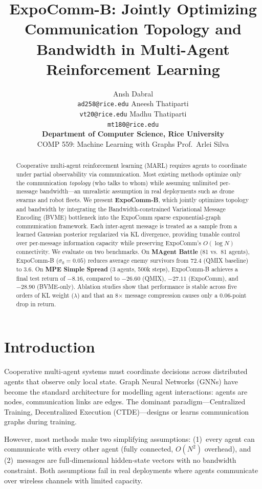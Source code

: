 \documentclass{article}
\title{ExpoComm-B: Jointly Optimizing Communication Topology and Bandwidth in Multi-Agent Reinforcement Learning}
\author{
  Ansh Dabral \\ \texttt{ad258@rice.edu}
  \And
  Aneesh Thatiparti \\ \texttt{vt20@rice.edu}
  \And
  Madhu Thatiparti \\ \texttt{mt180@rice.edu} \\[4pt]
  \textbf{Department of Computer Science, Rice University} \\
  COMP 559: Machine Learning with Graphs \quad Prof.\ Arlei Silva
}
\begin{document}
\maketitle

\begin{abstract}
Cooperative multi-agent reinforcement learning (MARL) requires agents to coordinate under partial observability via communication. Most existing methods optimize only the communication \textit{topology} (who talks to whom) while assuming unlimited per-message bandwidth---an unrealistic assumption in real deployments such as drone swarms and robot fleets. We present \textbf{ExpoComm-B}, which jointly optimizes topology and bandwidth by integrating the Bandwidth-constrained Variational Message Encoding (BVME) bottleneck into the ExpoComm sparse exponential-graph communication framework. Each inter-agent message is treated as a sample from a learned Gaussian posterior regularized via KL divergence, providing tunable control over per-message information capacity while preserving ExpoComm's $O(\log N)$ connectivity. We evaluate on two benchmarks. On \textbf{MAgent Battle} (81 vs.\ 81 agents), ExpoComm-B ($\sigma_0{=}0.05$) reduces average enemy survivors from 72.4 (QMIX baseline) to 3.6. On \textbf{MPE Simple Spread} (3 agents, 500k steps), ExpoComm-B achieves a final test return of $-8.16$, compared to $-26.60$ (QMIX), $-27.11$ (ExpoComm), and $-28.90$ (BVME-only). Ablation studies show that performance is stable across five orders of KL weight ($\lambda$) and that an 8$\times$ message compression causes only a 0.06-point drop in return.
\end{abstract}

\section{Introduction}
\label{sec:intro}

Cooperative multi-agent systems must coordinate decisions across distributed agents that observe only local state. Graph Neural Networks (GNNs) have become the standard architecture for modelling agent interactions: agents are nodes, communication links are edges. The dominant paradigm---Centralized Training, Decentralized Execution (CTDE)---designs or learns communication graphs during training.

However, most methods make two simplifying assumptions: (1)~every agent can communicate with every other agent (fully connected, $O(N^2)$ overhead), and (2)~messages are full-dimensional hidden-state vectors with no bandwidth constraint. Both assumptions fail in real deployments where agents communicate over wireless channels with limited capacity.
\end{document}
